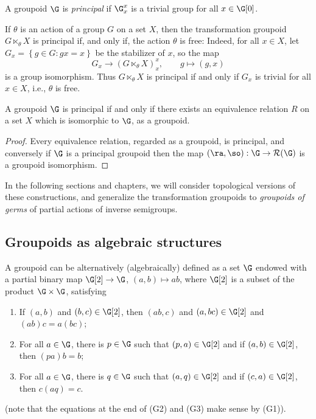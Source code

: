 \begin{definition}\label{definitionprincipalgroupoid}
A groupoid $\G$ is \emph{principal} if $\G_x^x$ is a trivial group for all $x\in\G[0]$.
\end{definition}

\begin{example}\label{examplewhentransformationgroupoidisprincipal}
If $\theta$ is an action of a group $G$ on a set $X$, then the transformation groupoid $G\ltimes_\theta X$ is principal if, and only if, the action $\theta$ is free: Indeed, for all $x\in X$, let $G_x=\left\{g\in G:gx=x\right\}$ be the stabilizer of $x$, so the map
\[G_x\to (G\ltimes_\theta X)_x^x,\qquad g\mapsto (g,x)\]
is a group isomorphism. Thus $G\ltimes_\theta X$ is principal if and only if $G_x$ is trivial for all $x\in X$, i.e., $\theta$ is free.
\end{example}

\begin{proposition}\label{principalequalequivalencerelation}
A groupoid $\G$ is principal if and only if there exists an equivalence relation $R$ on a set $X$ which is isomorphic to $\G$, as a groupoid.
\end{proposition}
\begin{proof}
Every equivalence relation, regarded as a groupoid, is principal, and conversely if $\G$ is a principal groupoid then the map $(\ra,\so):\G\to\mathcal{R}(\G)$ is a groupoid isomorphism.\qedhere
\end{proof}

In the following sections and chapters, we will consider topological versions of these constructions, and generalize the transformation groupoids to \emph{groupoids of germs} of partial actions of inverse semigroups.

\subsection{Groupoids as algebraic structures}

A groupoid can be alternatively (algebraically) defined as a set $\G$ endowed with a partial binary map $\G[2]\to\G$, $(a,b)\mapsto ab$, where $\G[2]$ is a subset of the product $\G\times\G$, satisfying
\begin{enumerate}
\item[(G1)] If $(a,b)$ and $(b,c)\in\G[2]$, then $(ab,c)$ and $(a,bc)\in\G[2]$ and $(ab)c=a(bc)$;
\item[(G2)] For all $a\in\G$, there is $p\in\G$ such that $(p,a)\in\G[2]$ and if $(a,b)\in\G[2]$, then $(pa)b=b$;
\item[(G3)] For all $a\in\G$, there is $q\in\G$ such that $(a,q)\in\G[2]$ and if $(c,a)\in\G[2]$, then $c(aq)=c$.
\end{enumerate}
(note that the equations at the end of (G2) and (G3) make sense by (G1)).

